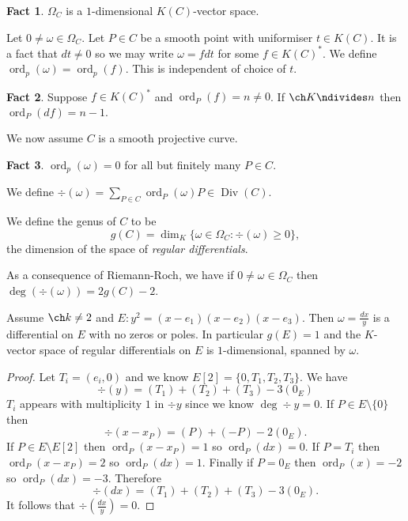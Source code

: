 \documentclass[a4paper]{article}
\theoremstyle{definition}
\newtheorem*{fact}{Fact}
\theoremstyle{theorem}
\DeclareMathOperator{\ord}{ord}
\DeclareMathOperator{\Div}{Div} %
\begin{document}
\begin{fact}
  \(\Omega_C\) is a \(1\)-dimensional \(K(C)\)-vector space.
\end{fact}

Let \(0 \neq \omega \in \Omega_C\). Let \(P \in C\) be a smooth point with uniformiser \(t \in K(C)\). It is a fact that \(dt \neq 0\) so we may write \(\omega = f dt\) for some \(f \in K(C)^*\). We define \(\ord_p(\omega) = \ord_p(f)\). This is independent of choice of \(t\).

\begin{fact}
  Suppose \(f \in K(C)^*\) and \(\ord_P(f) = n \neq 0\). If \(\ch K \ndivides n\) then \(\ord_P(df) = n - 1\).
\end{fact}

We now assume \(C\) is a smooth projective curve.

\begin{fact}
  \(\ord_p(\omega) = 0\) for all but finitely many \(P \in C\).
\end{fact}

\begin{definition}
  We define \(\div(\omega) = \sum_{P \in C} \ord_P(\omega) P \in \Div(C)\).
\end{definition}

\begin{definition}
  We define the genus of \(C\) to be
  \[
    g(C) = \dim_K \{\omega \in \Omega_C: \div(\omega) \geq 0\},
  \]
  the dimension of the space of \emph{regular differentials}.
\end{definition}

As a consequence of Riemann-Roch, we have if \(0 \neq \omega \in \Omega_C\) then \(\deg(\div(\omega)) = 2 g(C) - 2\).

\begin{lemma}
  Assume \(\ch k \neq 2\) and \(E: y^2 = (x - e_1)(x - e_2)(x - e_3)\). Then \(\omega = \frac{dx}{y}\) is a differential on \(E\) with no zeros or poles. In particular \(g(E) = 1\) and the \(K\)-vector space of regular differentials on \(E\) is \(1\)-dimensional, spanned by \(\omega\).
\end{lemma}

\begin{proof}
  Let \(T_i = (e_i, 0)\) and we know \(E[2] = \{0, T_1, T_2, T_3\}\). We have
  \[
    \div (y) = (T_1) + (T_2) + (T_3) - 3(0_E)
  \]
  \(T_i\) appears with multiplicity \(1\) in \(\div y\) since we know \(\deg \div y = 0\). If \(P \in E \setminus \{0\}\) then
  \[
    \div (x - x_P) = (P) + (-P) - 2(0_E).
  \]
  If \(P \in E \setminus E[2]\) then \(\ord_P(x - x_P) = 1\) so \(\ord_P(dx) = 0\). If \(P = T_i\) then \(\ord_P(x - x_P) = 2\) so \(\ord_P(dx) = 1\). Finally if \(P = 0_E\) then \(\ord_P(x) = -2\) so \(\ord_P(dx) = -3\). Therefore
  \[
    \div(dx) = (T_1) + (T_2) + (T_3) - 3(0_E).
  \]
  It follows that \(\div (\frac{dx}{y}) = 0\).
\end{proof}
\end{document}

